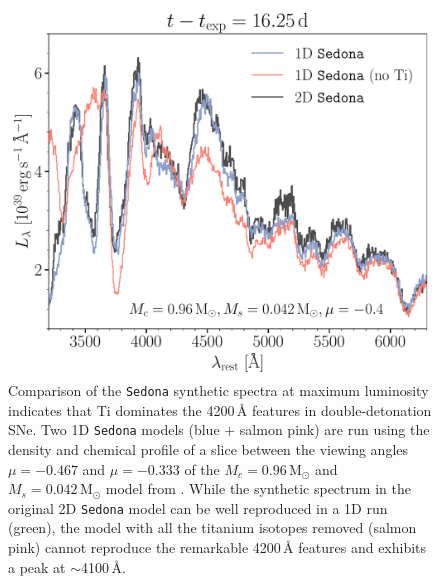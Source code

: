 \documentclass[twocolumn]{aastex631}
\begin{document}
\begin{CJK*}{UTF8}{gbsn}
\begin{figure}
    \centering
    \includegraphics[width=\linewidth]{Ti_II.pdf}
    \caption{Comparison of the \texttt{Sedona} synthetic spectra at maximum luminosity indicates that Ti dominates the 4200\,\r{A} features in double-detonation SNe. Two 1D \texttt{Sedona} models (blue + salmon pink) are run using the density and chemical profile of a slice between the viewing angles $\mu=-0.467$ and $\mu=-0.333$ of the $M_c=0.96\,\mathrm{M_\odot}$ and $M_s=0.042\,\mathrm{M_\odot}$ model from \citet{Boos_2021}. While the synthetic spectrum in the original 2D \texttt{Sedona} model can be well reproduced in a 1D run (green), the model with all the titanium isotopes removed (salmon pink) cannot reproduce the remarkable 4200\,\r{A} features and exhibits a peak at $\sim$4100\,\r{A}.}
    \label{fig:Ti}
\end{figure}

\end{CJK*}
\end{document}
